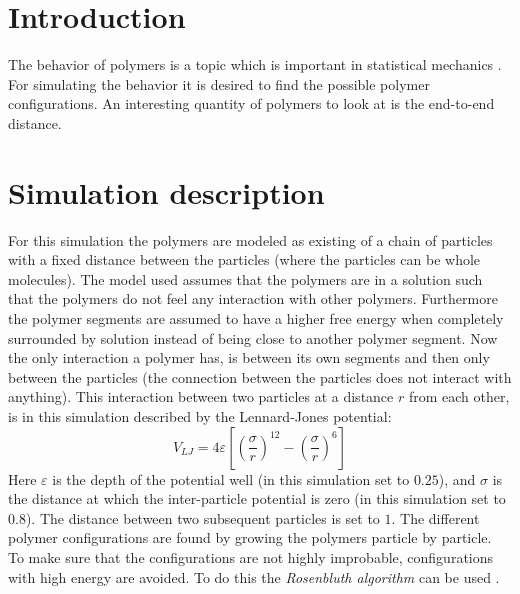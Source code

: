 \documentclass{article}
\begin{document}
\begin{multicols}{2}
\section*{Introduction}
The behavior of polymers is a topic which is important in statistical mechanics \cite{Jos}\cite{Paper}.  For simulating the behavior it is desired to find the possible polymer configurations. An interesting quantity of polymers to look at is the end-to-end distance.
\section*{Simulation description}
For this simulation the polymers are modeled as existing of a chain of particles with a fixed distance between the particles (where the particles can be whole molecules). The model used assumes that the polymers are in a solution such that the polymers do not feel any interaction with other polymers. Furthermore the polymer segments are assumed to have a higher free energy when completely surrounded by solution instead of being close to another polymer segment. Now the only interaction a polymer has, is between its own segments and then only between the particles (the connection between the particles does not interact with anything). This interaction between two particles at a distance $r$ from each other, is in this simulation described by the Lennard-Jones potential:
\begin{equation}
 V_{LJ}=4\varepsilon\left[\left(\frac{\sigma}{r}\right)^{ 12}-\left(\frac{\sigma}{r}\right)^{6}\right]
 \label{eq:LennardJones}
 \end{equation}
Here $\varepsilon$ is the depth of the potential well (in this simulation set to $0.25$), and $\sigma$ is the distance at which the inter-particle potential is zero (in this simulation set to $0.8$). The distance between two subsequent particles is set to $1$. The different polymer configurations are found by growing the polymers particle by particle. To make sure that the configurations are not highly improbable, configurations with high energy are avoided. To do this  the \emph{Rosenbluth algorithm} can be used \cite{Jos}. 

\end{multicols}
\end{document}
